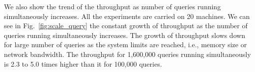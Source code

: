 We also show the trend of the throughput as number of queries running simultaneously increases. All the experiments are carried on 20 machines. We can see in Fig.~\ref{fig:scale_query} the constant growth of throughput as the number of queries running simultaneously increases. The growth of throughput slows down for large number of queries as the system limits are reached, i.e., memory size or network bandwidth. The throughput for 1,600,000 queries running simultaneously is 2.3 to 5.0 times higher than it for 100,000 queries.
